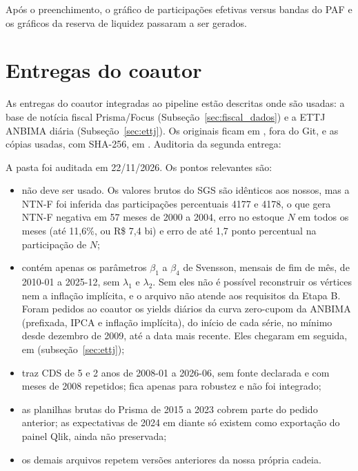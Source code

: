 \documentclass[12pt,a4paper]{article}
\begin{document}
Após o preenchimento, o gráfico de participações efetivas versus bandas do PAF e os
gráficos da reserva de liquidez passaram a ser gerados.

\section{Entregas do coautor}\label{app:coautor}

As entregas do coautor integradas ao pipeline estão descritas onde são usadas: a
base de notícia fiscal Prisma/Focus (Subseção~\ref{sec:fiscal_dados}) e a ETTJ
ANBIMA diária (Subseção~\ref{sec:ettj}). Os originais ficam em ,
fora do Git, e as cópias usadas, com SHA-256, em . Auditoria da
segunda entrega:

A pasta  foi auditada em 22/11/2026. Os pontos relevantes são:

\begin{itemize}[leftmargin=1.2cm]
    \item {} não deve ser usado. Os valores brutos do
    SGS são idênticos aos nossos, mas a NTN-F foi inferida das participações
    percentuais 4177 e 4178, o que gera NTN-F negativa em 57 meses de 2000 a 2004,
    erro no estoque \(N\) em todos os meses (até 11,6\%, ou R\$ 7,4 bi) e erro de até
    1,7 ponto percentual na participação de \(N\);
    \item {} contém apenas os parâmetros \(\beta_1\) a
    \(\beta_4\) de Svensson, mensais de fim de mês, de 2010-01 a 2025-12, sem
    \(\lambda_1\) e \(\lambda_2\). Sem eles não é possível reconstruir os vértices
    nem a inflação implícita, e o arquivo não atende aos requisitos da Etapa B. Foram
    pedidos ao coautor os yields diários da curva zero-cupom da ANBIMA (prefixada,
    IPCA e inflação implícita), do início de cada série, no mínimo desde
    dezembro de 2009, até a data mais recente. Eles chegaram em seguida, em
     (subseção~\ref{sec:ettj});
    \item {} traz CDS de 5 e 2 anos de 2008-01 a 2026-06, sem fonte
    declarada e com meses de 2008 repetidos; fica apenas para robustez e não foi
    integrado;
    \item as planilhas brutas do Prisma de 2015 a 2023 cobrem parte do pedido
    anterior; as expectativas de 2024 em diante só existem como exportação do painel
    Qlik, ainda não preservada;
    \item os demais arquivos repetem versões anteriores da nossa própria cadeia.
\end{itemize}
\end{document}
